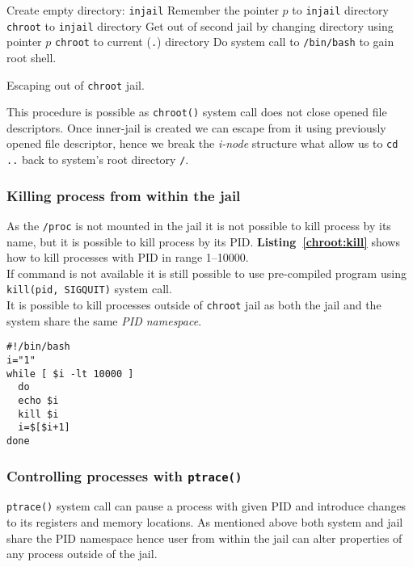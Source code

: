 \documentclass[12pt, a4paper, pdflatex]{article}
\begin{document}
\SetAlCapSkip{1em}
\LinesNumbered
{}
\vspace{1em}
\begin{algorithm}[h]
  Create empty directory: \texttt{injail}\;
  Remember the pointer $p$ to \texttt{injail} directory\;
  \texttt{chroot} to \texttt{injail} directory\;
  Get out of second jail by changing directory using pointer $p$\;
  \texttt{chroot} to current (\texttt{.}) directory\;
  Do system call to \texttt{/bin/bash} to gain root shell.
  \caption{Escaping out of \texttt{chroot} jail.\label{alg:chroot:cd}}
\end{algorithm}
\vspace{1em}

This procedure is possible as \texttt{chroot()} system call does not close opened file descriptors. Once inner-jail is created we can escape from it using previously opened file descriptor, hence we break the \emph{i-node} structure what allow us to \texttt{cd ..} back to system's root directory \texttt{/}.

\subsubsection{Killing process from within the jail}
As the \texttt{/proc} is not mounted in the jail it is not possible to kill process by its name, but it is possible to kill process by its PID. \textbf{Listing~\ref{chroot:kill}} shows how to kill processes with PID in range 1--10000.\\
If command is not available it is still possible to use pre-compiled program using \texttt{kill(pid, SIGQUIT)} system call.\\
It is possible to kill processes outside of \texttt{chroot} jail as both the jail and the system share the same \emph{PID namespace}.


\vspace{1em}
\lstset{
  captionpos=b,
  frame=single,
  language=bash,
  breaklines=true,
  caption=Kill processes outside of chroot jail.,
  label=chroot:kill
}
\begin{lstlisting}
#!/bin/bash
i="1"
while [ $i -lt 10000 ]
  do
  echo $i
  kill $i
  i=$[$i+1]
done
\end{lstlisting}

\subsubsection{Controlling processes with \texttt{ptrace()}}
\texttt{ptrace()} system call can pause a process with given PID and introduce changes to its registers and memory locations. As mentioned above both system and jail share the PID namespace hence user from within the jail can alter properties of any process outside of the jail.
\end{document}
